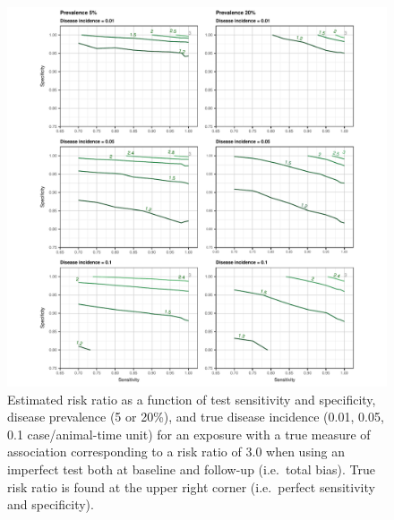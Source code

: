 \documentclass[utf8]{frontiersSCNS}\usepackage[]{graphicx}\usepackage[]{color}
\begin{document}
\begin{figure}[htbp]
  \begin{center}
    \includegraphics[scale=.95]{master-risk_contour-1}
    \end{center}
  \caption{Estimated risk ratio as a function of test sensitivity and
    specificity, disease prevalence (5 or 20\%), and true disease incidence
    (0.01, 0.05, 0.1 case/animal-time unit) for an exposure with a true measure
    of association corresponding to a risk ratio of \(3.0\) when using an
    imperfect test both at baseline and follow-up (i.e.\ total bias). True risk
    ratio is found at the upper right corner (i.e.\ perfect sensitivity and
    specificity).}
  \label{fig:incidence_risk}
\end{figure}
\end{document}
